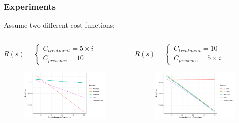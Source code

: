 \documentclass[aspectratio=169]{beamer}
\begin{document}
\begin{frame}
	\frametitle{Experiments}
	Assume two different cost functions:
	\begin{columns}
	
		\begin{column}{0.5\textwidth}
			$
				R(s) = 
				\begin{cases}
					C_{treatment} = 5 \times i \\
					C_{presence} = 10
				\end{cases}
			$

			\begin{figure}
				\centering
				\includegraphics[scale=.4]{increasing_cost_treatment.pdf}
				\label{fig:treatment}
			\end{figure}

		\end{column}

		\begin{column}{0.5\textwidth}
			$
				R(s) = 
				\begin{cases}
					C_{treatment} = 10 \\
					C_{presence} = 5 \times i
				\end{cases}
			$
		\begin{figure}
			\centering
			\includegraphics[scale=.4]{increasing_cost_presence.pdf}
			\label{fig:presence}
		\end{figure}

		\end{column}

	\end{columns}

\end{frame}
\end{document}
